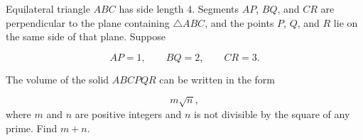 Equilateral triangle $ABC$ has side length $4$. Segments $AP$, $BQ$, and $CR$ are perpendicular to the plane containing $\triangle ABC$, and the points $P$, $Q$, and $R$ lie on the same side of that plane. Suppose

\[
        AP=1,\qquad BQ=2,\qquad CR=3.
    \]

The volume of the solid $ABCPQR$ can be written in the form

\[
        m\sqrt{n},
    \]where $m$ and $n$ are positive integers and $n$ is not divisible by the square of any prime. Find $m+n$.
